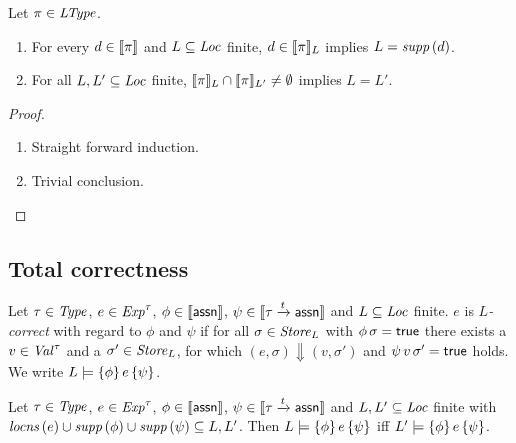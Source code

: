\documentclass[12pt,a4paper]{report}
\begin{document}
\begin{lemma}
  Let $\pi\in\mathit{LType}$.
  \begin{enumerate}
    \item For every $d\in\llbracket\pi\rrbracket$ and $L\subseteq\mathit{Loc}$ finite,
          $d\in\llbracket\pi\rrbracket_L$ implies $L = \mathit{supp}\,(d)$.
    \item For all $L,L'\subseteq\mathit{Loc}$ finite, $\llbracket\pi\rrbracket_L \cap \llbracket\pi\rrbracket_{L'} \ne \emptyset$
          implies $L = L'$.
  \end{enumerate}
\end{lemma}

\begin{proof} \
  \begin{enumerate}
    \item Straight forward induction.
    \item Trivial conclusion.
  \end{enumerate}
\end{proof}



\subsection{Total correctness}

\begin{definition}
  Let $\tau\in\mathit{Type}$, $e\in\mathit{Exp}^\tau$, $\phi\in\llbracket\mathsf{assn}\rrbracket$, $\psi\in\llbracket\tau\xrightarrow{t}\mathsf{assn}\rrbracket$
  and $L \subseteq \mathit{Loc}$ finite. $e$ is {\em $L$-correct} with regard to $\phi$ and $\psi$ if for all
  $\sigma\in\mathit{Store}_L$ with $\phi\,\sigma=\mathsf{true}$ there exists a $v\in\mathit{Val}^\tau$ and a $\sigma'\in\mathit{Store}_L$,
  for which $(e,\sigma) \Downarrow (v,\sigma')$ and $\psi\,v\,\sigma' = \mathsf{true}$ holds. We write
  $L \models \{\phi\}\,e\,\{\psi\}$.
\end{definition}


\begin{proposition}
  Let $\tau\in\mathit{Type}$, $e\in\mathit{Exp}^\tau$, $\phi\in\llbracket\mathsf{assn}\rrbracket$, $\psi\in\llbracket\tau\xrightarrow{t}\mathsf{assn}\rrbracket$
  and $L,L' \subseteq \mathit{Loc}$ finite with $\mathit{locns}\,(e) \cup \mathit{supp}\,(\phi) \cup \mathit{supp}\,(\psi) \subseteq L,L'$. Then
  $L \models \{\phi\}\,e\,\{\psi\}$ iff $L' \models \{\phi\}\,e\,\{\psi\}$.
\end{proposition}
\end{document}
